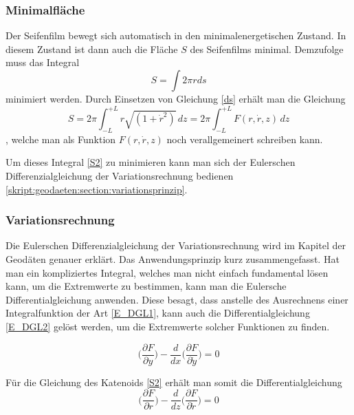 \begin{refsection}
\subsubsection{Minimalfläche}
Der Seifenfilm bewegt sich automatisch in den minimalenergetischen Zustand. 
In diesem Zustand ist dann auch die Fläche $S$ des Seifenfilms minimal.
Demzufolge muss das Integral 
\begin{equation} \label{S1}  
  S= \int 2 \pi r ds 
\end{equation}
minimiert werden. 
Durch Einsetzen von Gleichung \eqref{ds} erhält man die Gleichung 
\begin{equation} \label{S2}
  S=2 \pi \int_{-L}^{+L} r\sqrt{(1+\dot r^2)}\,dz =2 \pi \int_{-L}^{+L}  F(r,\dot r, z) \,dz 
\end{equation}
, welche man als Funktion $F(r,\dot r, z)$ noch verallgemeinert schreiben kann.



Um dieses Integral \eqref{S2} zu minimieren kann man sich der Eulerschen Differenzialgleichung der Variationsrechnung bedienen 
\ref{skript:geodaeten:section:variationsprinzip}. 
\subsubsection{Variationsrechnung}
Die Eulerschen Differenzialgleichung der Variationsrechnung wird im Kapitel der Geodäten genauer erklärt.
Das Anwendungsprinzip kurz zusammengefasst. Hat man ein kompliziertes Integral, welches man nicht einfach fundamental lösen kann, um die Extremwerte zu bestimmen, kann man die Eulersche Differentialgleichung anwenden. Diese besagt, dass anstelle des Ausrechnens  einer Integralfunktion der Art \eqref{E_DGL1}, kann auch die Differentialgleichung \eqref{E_DGL2} gelöst werden, um die Extremwerte solcher Funktionen zu finden.



\begin{equation} \label{E_DGL2}
\bigg(\frac{\partial F}{\partial y}\bigg)- \frac{d}{dx} \bigg(\frac{\partial F}{\partial \dot{y}}\bigg)=0         
\end{equation}

Für die Gleichung des Katenoids \eqref{S2} erhält man somit die Differentialgleichung
\begin{equation} \label{K_DGL1}
\bigg(\frac{\partial F}{\partial r}\bigg)- \frac{d}{dz} \bigg(\frac{\partial F}{\partial \dot{r}}\bigg)=0    
\end{equation}


\end{refsection}
